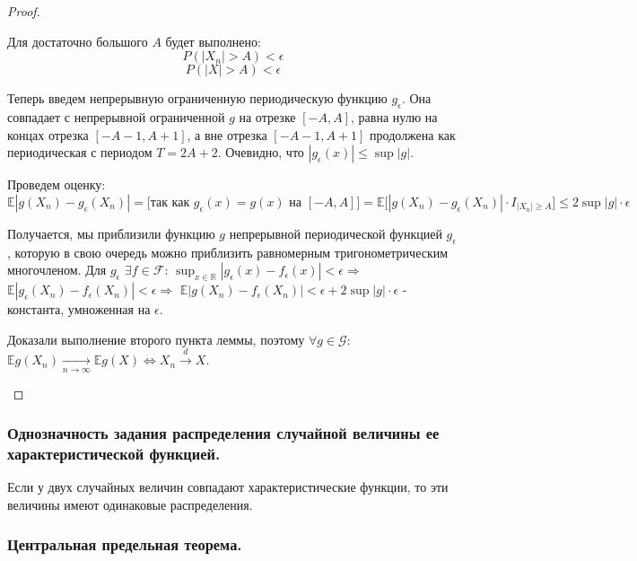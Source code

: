 \begin{proof}
\begin{itemize}
        Для достаточно большого $A$ будет выполнено: $$ P(|X_n| > A) < \epsilon $$ $$ P(|X| > A) < \epsilon $$
        
        Теперь введем непрерывную ограниченную периодическую функцию $g_{\epsilon}$. Она совпадает с непрерывной ограниченной $g$ на отрезке $[-A, A]$, равна нулю на концах отрезка $[-A - 1, A + 1]$, а вне отрезка $[-A - 1, A + 1]$ продолжена как периодическая с периодом $T = 2A + 2$. Очевидно, что $|g_{\epsilon}(x)| \leq \sup|g|$.
        
        Проведем оценку: $$ \mathbb{E}|g(X_n) - g_{\epsilon}(X_n)| = \Big[ \textrm{так как } g_{\epsilon}(x) = g(x) \textrm{ на } [-A, A] \Big] = \mathbb{E}\big[ |g(X_n) - g_{\epsilon}(X_n)| \cdot I_{|X_n| \geq A} \big] \leq 2\sup|g| \cdot \epsilon $$
        
        Получается, мы приблизили функцию $g$ непрерывной периодической функцией $g_{\epsilon}$, которую в свою очередь можно приблизить равномерным тригонометрическим многочленом. Для $g_{\epsilon}$ $\exists f \in \mathcal{F}$: $\sup_{x \in \mathbb{R}}|g_{\epsilon}(x) - f_{\epsilon}(x)| < \epsilon \Rightarrow$ $\mathbb{E}|g_{\epsilon}(X_n) - f_{\epsilon}(X_n)| < \epsilon \Rightarrow$ $\mathbb{E}|g(X_n) - f_{\epsilon}(X_n)| < \epsilon + 2\sup|g| \cdot \epsilon$ - константа, умноженная на $\epsilon$.
        
        Доказали выполнение второго пункта леммы, поэтому $\forall g \in \mathcal{G}$: $\mathbb{E}g(X_n) \xrightarrow[n \rightarrow \infty]{} \mathbb{E}g(X) \Leftrightarrow X_n \xrightarrow{d} X$.
    \end{itemize}
\end{proof}

\subsubsection{Однозначность задания распределения случайной величины ее характеристической функцией.}

\begin{theorem*}
    Если у двух случайных величин совпадают характеристические функции, то эти величины имеют одинаковые распределения.
\end{theorem*}

\subsubsection{Центральная предельная теорема.}

